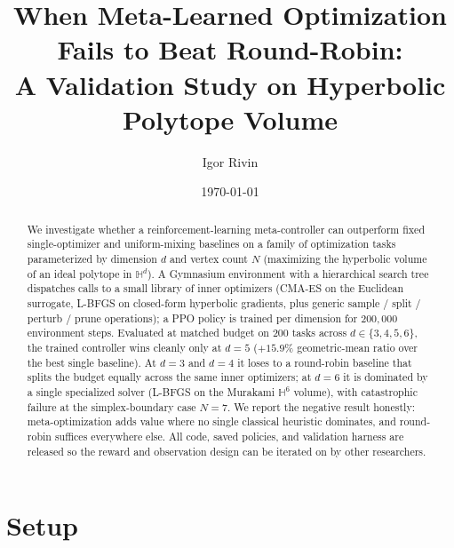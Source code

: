 \documentclass[11pt]{article}
\title{When Meta-Learned Optimization Fails to Beat Round-Robin:\\
A Validation Study on Hyperbolic Polytope Volume}
\author{Igor Rivin}
\date{\today}
\begin{document}
\maketitle

\begin{center}
\end{center}

\begin{abstract}
We investigate whether a reinforcement-learning meta-controller can
outperform fixed single-optimizer and uniform-mixing baselines on a
family of optimization tasks parameterized by dimension $d$ and
vertex count $N$ (maximizing the hyperbolic volume of an ideal
polytope in $\mathbb{H}^d$).  A Gymnasium environment with a
hierarchical search tree dispatches calls to a small library of inner
optimizers (CMA-ES on the Euclidean surrogate, L-BFGS on closed-form
hyperbolic gradients, plus generic sample / split / perturb / prune
operations); a PPO policy is trained per dimension for
$200{,}000$ environment steps.  Evaluated at matched budget on
$200$ tasks across $d \in \{3, 4, 5, 6\}$, the trained controller
wins cleanly only at $d = 5$ ($+15.9\%$ geometric-mean ratio over
the best single baseline).  At $d = 3$ and $d = 4$ it loses to a
round-robin baseline that splits the budget equally across the same
inner optimizers; at $d = 6$ it is dominated by a single specialized
solver (L-BFGS on the Murakami $\mathbb{H}^6$ volume), with
catastrophic failure at the simplex-boundary case $N = 7$.  We
report the negative result honestly: meta-optimization adds value
where no single classical heuristic dominates, and round-robin
suffices everywhere else.  All code, saved policies, and validation
harness are released so the reward and observation design can be
iterated on by other researchers.
\end{abstract}

\section{Setup}
\end{document}
